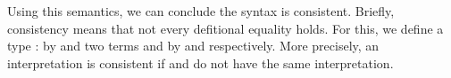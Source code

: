 
Using this semantics, we can conclude the syntax is consistent.
Briefly, consistency means that not every defitional equality holds.
For this, we define a type  :   by  and two terms  and  by  and  respectively.
More precisely, an interpretation is consistent if  and  do not have the same interpretation.

